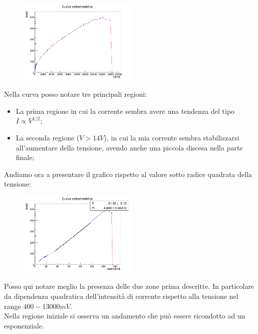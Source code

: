 \documentclass[10pt,twocolumn]{article}
\begin{document}
\begin{figure}[H] %
  \centering
  \includegraphics[width=0.5\textwidth]{curva_voltammetrica/curva_voltamperometrica.png} %
  \label{fig:I_V_}
\end{figure}
Nella curva posso notare tre principali regioni:
\begin{itemize}
    \item La prima regione in cui la corrente sembra avere una tendenza del tipo $I \propto V^{1/2}$;
    \item La seconda regione ($V > 14V$), in cui la mia corrente sembra stabilizzarsi all'aumentare della tensione, avendo anche una piccola discesa nella parte finale;
\end{itemize}
Andiamo ora a presentare il grafico rispetto al valore sotto radice quadrata della tensione:
\begin{figure}[H] %
  \centering
  \includegraphics[width=0.5\textwidth]{curva_voltammetrica/curva_voltammetrica_sqrt.png} %
  \label{fig:I_V_}
\end{figure}
\noindent Posso qui notare meglio la presenza delle due zone prima descritte. In particolare da dipendenza quadratica dell'intensità di corrente rispetto alla tensione nel range $400-13000mV$.\\ 
Nella regione iniziale si osserva un andamento che può essere ricondotto ad un esponenziale. 
\end{document}
